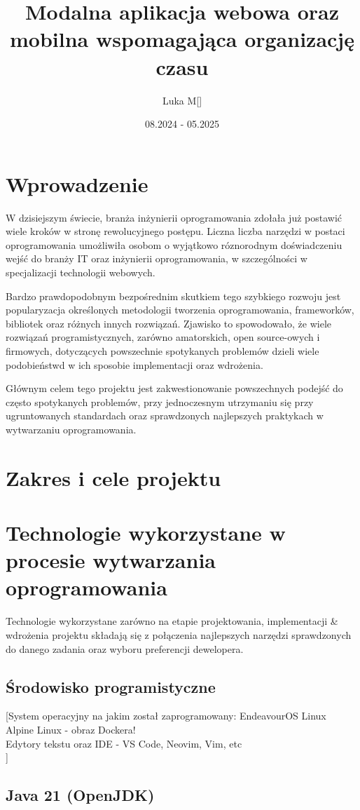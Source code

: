 \documentclass[12pt, a4paper]{article}
\title{Modalna aplikacja webowa oraz mobilna wspomagająca organizację czasu}
\author{Luka M[]}
\date{08.2024 - 05.2025}
\begin{document}
\maketitle

\section*{Wprowadzenie}
W dzisiejszym świecie, branża inżynierii oprogramowania zdołała już postawić wiele kroków w stronę rewolucyjnego postępu. Liczna liczba narzędzi w postaci oprogramowania umożliwiła osobom o wyjątkowo róznorodnym doświadczeniu wejść do branży IT oraz inżynierii oprogramowania, w szczególności w specjalizacji technologii webowych.

Bardzo prawdopodobnym bezpośrednim skutkiem tego szybkiego rozwoju jest popularyzacja określonych metodologii tworzenia oprogramowania, frameworków, bibliotek oraz różnych innych rozwiązań. Zjawisko to spowodowało, że wiele rozwiązań programistycznych, zarówno amatorskich, open source-owych i firmowych, dotyczących powszechnie spotykanych problemów dzieli wiele podobieństwd w ich sposobie implementacji oraz wdrożenia.

Głównym celem tego projektu jest zakwestionowanie powszechnych podejść do często spotykanych problemów, przy jednoczesnym utrzymaniu się przy  ugruntowanych standardach oraz sprawdzonych najlepszych praktykach w wytwarzaniu oprogramowania.
\section{Zakres i cele projektu}
\section{Technologie wykorzystane w procesie wytwarzania oprogramowania}
Technologie wykorzystane zarówno na etapie projektowania, implementacji \& wdrożenia projektu składają się z połączenia najlepszych narzędzi sprawdzonych do danego zadania oraz wyboru preferencji dewelopera.
\subsection{Środowisko programistyczne}
[System operacyjny na jakim został zaprogramowany: EndeavourOS Linux \\
Alpine Linux - obraz Dockera! \\
Edytory tekstu oraz IDE - VS Code, Neovim, Vim, etc \\]
\subsection{Java 21 (OpenJDK)}
\end{document}
